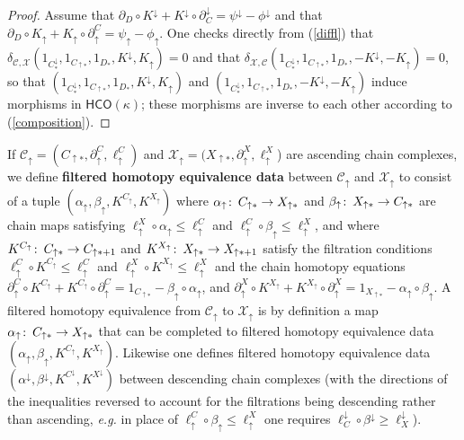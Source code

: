 \documentclass[11pt]{amsart}
\theoremstyle{definition}
\theoremstyle{remark}
\numberwithin{equation}{section}
\def\co{\colon\thinspace}
\begin{document}
\begin{proof}
	Assume that $\partial_D\circ K^{\downarrow}+K^{\downarrow}\circ\partial_{C}^{\downarrow}=\psi^{\downarrow}-\phi^{\downarrow}$ and that $\partial_D\circ K_{\uparrow}+K_{\uparrow}\circ\partial^{C}_{\uparrow}=\psi_{\uparrow}-\phi_{\uparrow}$.  One checks directly from (\ref{diffl}) that $\delta_{\mathcal{C},\mathcal{X}}(1_{C^{\downarrow}_{*}},1_{C_{\uparrow *}},1_{D_*},K^{\downarrow},K_{\uparrow})=0$ and that $\delta_{\mathcal{X},\mathcal{C}}(1_{C^{\downarrow}_{*}},1_{C_{\uparrow *}},1_{D_*},-K^{\downarrow},-K_{\uparrow})=0$, so that $(1_{C^{\downarrow}_{*}},1_{C_{\uparrow *}},1_{D_*},K^{\downarrow},K_{\uparrow})$ and $(1_{C^{\downarrow}_{*}},1_{C_{\uparrow *}},1_{D_*},-K^{\downarrow},-K_{\uparrow})$ induce morphisms in $\mathsf{HCO}(\kappa)$; these morphisms are inverse to each other according to (\ref{composition}).
\end{proof}

If $\mathcal{C}_{\uparrow}=(C_{\uparrow*},\partial_{\uparrow}^{C},\ell_{\uparrow}^{C})$ and $\mathcal{X}_{\uparrow}=(X_{\uparrow*},\partial_{\uparrow}^{X},\ell_{\uparrow}^{X}$) are ascending chain complexes, we define \textbf{filtered homotopy equivalence data} between $\mathcal{C}_{\uparrow}$ and $\mathcal{X}_{\uparrow}$ to consist of a tuple $(\alpha_{\uparrow},\beta_{\uparrow},K^{C_{\uparrow}},K^{X_{\uparrow}})$ where $\alpha_{\uparrow}\co C_{\uparrow*}\to X_{\uparrow*}$ and $\beta_{\uparrow}\co X_{\uparrow *}\to C_{\uparrow*}$ are chain maps satisfying $\ell^X_{\uparrow}\circ \alpha_{\uparrow}\leq \ell^C_{\uparrow}$ and $\ell^{C}_{\uparrow}\circ \beta_{\uparrow}\leq \ell_{\uparrow}^{X}$, and where $K^{C_{\uparrow}}\co C_{\uparrow * }\to C_{\uparrow *+1}$ and $K^{X_{\uparrow}}\co X_{\uparrow *}\to X_{\uparrow *+1}$ satisfy the filtration conditions $\ell_{\uparrow}^{C}\circ K^{C_{\uparrow}}\leq \ell_{\uparrow}^{C}$ and $\ell_{\uparrow}^{X}\circ K^{X_{\uparrow}}\leq \ell_{\uparrow}^{X}$ and the chain homotopy equations $\partial_{\uparrow}^{C}\circ K^{C_{\uparrow}}+K^{C_{\uparrow}}\circ \partial_{\uparrow}^{C}=1_{C_{\uparrow *}}-\beta_{\uparrow}\circ \alpha_{\uparrow}$, and $\partial_{\uparrow}^{X}\circ K^{X_{\uparrow}}+K^{X_{\uparrow}}\circ \partial_{\uparrow}^{X}=1_{X_{\uparrow *}}-\alpha_{\uparrow}\circ \beta_{\uparrow}$.   A filtered homotopy equivalence from $\mathcal{C}_{\uparrow}$ to $\mathcal{X}_{\uparrow }$ is by definition a map $\alpha_{\uparrow}\co C_{\uparrow *}\to X_{\uparrow *}$ that can be completed to filtered homotopy equivalence data $(\alpha_{\uparrow},\beta_{\uparrow},K^{C_{\uparrow}},K^{X_{\uparrow}})$.   Likewise one defines filtered homotopy equivalence data $(\alpha^{\downarrow},\beta^{\downarrow},K^{C^{\downarrow}},K^{X^{\downarrow}})$ between descending chain complexes (with the directions of the inequalities reversed to account for the filtrations being descending rather than ascending, \emph{e.g.} in place of $\ell^{C}_{\uparrow}\circ \beta_{\uparrow}\leq \ell_{\uparrow}^{X}$ one requires $\ell_{C}^{\downarrow}\circ \beta^{\downarrow} \geq \ell^{\downarrow}_{X}$).  
\end{document}
